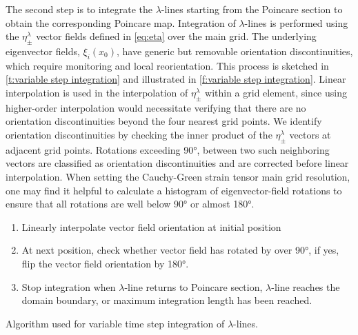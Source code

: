 \documentclass{article}
\begin{document}
The second step is to integrate the $\lambda$-lines  starting from the Poincare section to obtain the corresponding Poincare map. Integration of $\lambda$-lines is performed using the $\eta_\pm^\lambda$ vector fields defined in \cref{eq:eta} over the main grid. The underlying eigenvector fields, $\xi_i(x_0)$, have generic but removable orientation discontinuities, which require monitoring and local reorientation. This process is sketched in \cref{t:variable step integration} and illustrated in \cref{f:variable step integration}. Linear interpolation is used in the interpolation of $\eta_\pm^\lambda$ within a grid element, since using higher-order interpolation would necessitate verifying that there are no orientation discontinuities beyond the four nearest grid points. We identify orientation discontinuities by checking the inner product of the $\eta_\pm^\lambda$ vectors at adjacent grid points. Rotations exceeding 90°, between two such neighboring vectors are classified as orientation discontinuities and are corrected before linear interpolation. When setting the Cauchy-Green strain tensor main grid resolution, one may find it helpful to calculate a histogram of eigenvector-field rotations to ensure that all rotations are well below 90° or almost 180°.

\begin{table}
\begin{enumerate}
\item Linearly interpolate vector field orientation at initial position
\item At next position, check whether vector field has rotated by over 90°, if yes, flip the vector field orientation by 180°.
\item Stop integration when $\lambda$-line returns to Poincare section, $\lambda$-line reaches the domain boundary, or maximum integration length has been reached.
\end{enumerate}
\caption{Algorithm used for variable time step integration of $\lambda$-lines.}
\label{t:variable step integration}
\end{table}
\end{document}
